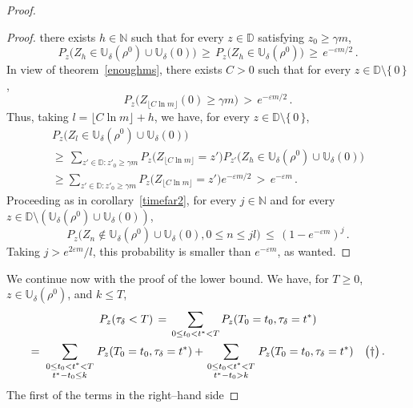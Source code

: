 \documentclass[a4paper,12pt]{article}
\theoremstyle{definition}
\theoremstyle{remark}
\def \g {\gamma}
\def \d {\delta}
\def \e {\varepsilon}
\def \dD {\mathbb{D}}
\def \N {\mathbb{N}}
\def \dU {\mathbb{U}}
\begin{document}
\begin{proof}
\begin{proof}
there exists $h\in\N$ such that for every $z\in\dD$ satisfying $z_0\geq \g m$,
$$P_z\big(
Z_h\in\dU_\d(\rho^0)\cup \dU_\d(0)\big)\,\geq\,
P_z\big(
Z_h\in\dU_\d(\rho^0)\big)\,\geq\,e^{-\e m /2}
\,.$$
In view of theorem~\ref{enoughms},
there exists $C>0$ such that for every 
$z\in \dD\setminus\lbrace\,0\,\rbrace$,
$$P_z\big(
Z_{\lfloor C\ln m\rfloor}(0)\geq \g m
\big)\,>\,e^{-\e m/2}\,.
$$
Thus, taking $l=\lfloor C\ln m\rfloor+h$,
we have, for every
$z\in \dD\setminus\lbrace\,0\,\rbrace$,
\begin{multline*}P_z\big(
Z_l\in \dU_\d(\rho^0)\cup\dU_\d(0)
\big)\\
\geq\,\sum_{z'\in\dD:z'_0\geq\g m}
P_z\big(Z_{\lfloor C\ln m\rfloor}=z'\big)P_{z'}\big(Z_h\in\dU_\d(\rho^0)\cup\dU_\d(0)\big)\\
\geq\sum_{z'\in\dD:z'_0\geq\g m}P_z\big(
Z_{\lfloor C\ln m\rfloor}=z'
\big)e^{-\e m/2}\,>\,e^{-\e m}\,.
\end{multline*}
Proceeding as in corollary~\ref{timefar2},
for every $j\in\N$ and for every $z\in\dD\setminus(\dU_\d(\rho^0)\cup\dU_\d(0))$,
$$P_z\big(
Z_n\not\in\dU_\d(\rho^0)\cup\dU_\d(0), 0\leq n\leq jl
\big)\,\leq\,(1-e^{-\e m})^j\,.$$
Taking $j>e^{2\e m}/l$,
this probability is smaller than $e^{-\e m}$, as wanted.
\end{proof}
We continue now with the proof of the lower bound.
We have, for $T\geq0$, $z\in\dU_\d(\rho^0)$, and $k\leq T$,
\begin{multline*}
P_z(\tau_\d< T)\,=\,\sum_{0\leq t_0<t^*< T}P_z(T_0=t_0,\tau_\d=t^*)\\
=\,\sum_{\genfrac{}{}{0pt}{1}{0\leq t_0<t^*<T}{t^*-t_0\leq k}}P_z(T_0=t_0,\tau_\d=t^*)
+\sum_{\genfrac{}{}{0pt}{1}{0\leq t_0<t^*<T}{t^*-t_0> k}}P_z(T_0=t_0,\tau_\d=t^*)
\quad\big(\dag \big)\,.
\end{multline*}
The first of the terms in the right--hand side 

\end{proof}
\end{document}
